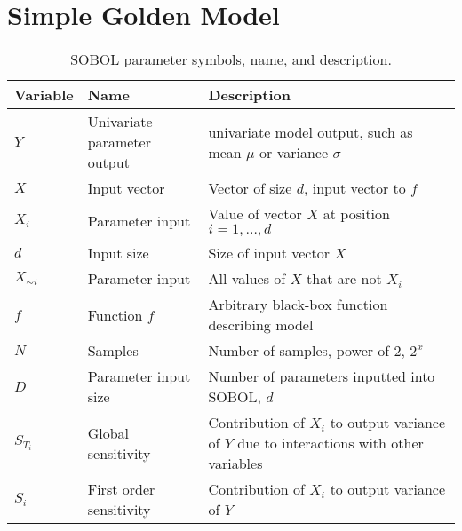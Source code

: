 \section{Simple Golden Model}
\begin{table}[htbp]
    \small %
    \centering
    \begin{tabularx}{\textwidth}{l l X}
        \toprule
        \textbf{Variable} & \textbf{Name} & \textbf{Description} \\
        \midrule
        $Y$ & Univariate parameter output & univariate model output, such as mean $\mu$ or variance $\sigma$ \\
        $X$ & Input vector & Vector of size $d$, input vector to $f$\\
        $X_i$ & Parameter input & Value of vector $X$ at position $i=1, \dots, d$ \\
        $d$ & Input size & Size of input vector $X$\\
        $X_{\sim i}$ & Parameter input & All values of $X$ that are not $X_i$ \\
        $f$ & Function $f$& Arbitrary black-box function describing model \\
        $N$ & Samples & Number of samples, power of 2, $2^x$ \\
        $D$ & Parameter input size & Number of parameters inputted into SOBOL, $d$ \\
        $S_{T_i}$ & Global sensitivity & Contribution of $X_i$ to output variance of $Y$ due to interactions with other variables  \\
        $S_i$ & First order sensitivity & Contribution of $X_i$ to output variance of $Y$ \\
        \bottomrule
    \end{tabularx} \newline
    \caption{SOBOL parameter symbols, name, and description. }
    \label{tab:parameter_table_SOBOL}
\end{table}

